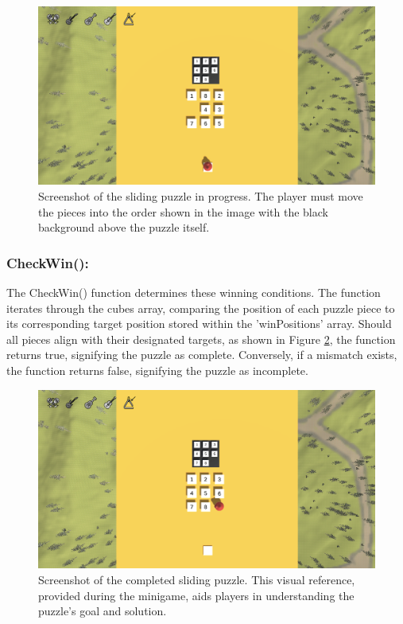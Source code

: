 \documentclass{l4proj}
\begin{document}
\begin{figure}[h]
  \centering
  \includegraphics[width=0.7\linewidth]{dissertation/images/Sliding_Incomplete.png} 
  \caption{Screenshot of the sliding puzzle in progress. The player must move the pieces into the order shown in the image with the black background above the puzzle itself.} 
  \label{fig:puzzle_incomplete} 
\end{figure}

\subsubsection{CheckWin():} The CheckWin() function determines these winning conditions. The function iterates through the cubes array, comparing the position of each puzzle piece to its corresponding target position stored within the 'winPositions' array. Should all pieces align with their designated targets, as shown in Figure \ref{fig:puzzle_complete}, the function returns true, signifying the puzzle as complete. Conversely, if a mismatch exists, the function returns false, signifying the puzzle as incomplete.

\begin{figure}[h]
  \centering
  \includegraphics[width=0.7\linewidth]{dissertation/images/Sliding_Complete.png} 
  \caption{Screenshot of the completed sliding puzzle. This visual reference, provided during the minigame, aids players in understanding the puzzle's goal and solution.} 
  \label{fig:puzzle_complete} 
\end{figure}
\end{document}
